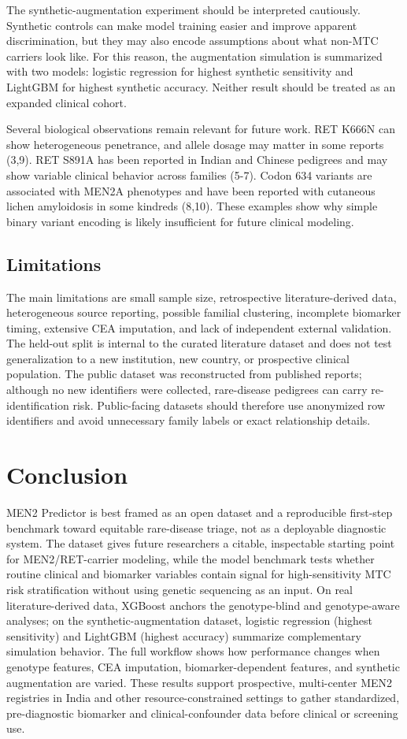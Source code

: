 \documentclass[12pt]{article}
\begin{document}
The synthetic-augmentation experiment should be interpreted cautiously. Synthetic controls can make model training easier and improve apparent discrimination, but they may also encode assumptions about what non-MTC carriers look like. For this reason, the augmentation simulation is summarized with two models: logistic regression for highest synthetic sensitivity and LightGBM for highest synthetic accuracy. Neither result should be treated as an expanded clinical cohort.

Several biological observations remain relevant for future work. RET K666N can show heterogeneous penetrance, and allele dosage may matter in some reports (3,9). RET S891A has been reported in Indian and Chinese pedigrees and may show variable clinical behavior across families (5-7). Codon 634 variants are associated with MEN2A phenotypes and have been reported with cutaneous lichen amyloidosis in some kindreds (8,10). These examples show why simple binary variant encoding is likely insufficient for future clinical modeling.

\subsection{Limitations}
The main limitations are small sample size, retrospective literature-derived data, heterogeneous source reporting, possible familial clustering, incomplete biomarker timing, extensive CEA imputation, and lack of independent external validation. The held-out split is internal to the curated literature dataset and does not test generalization to a new institution, new country, or prospective clinical population. The public dataset was reconstructed from published reports; although no new identifiers were collected, rare-disease pedigrees can carry re-identification risk. Public-facing datasets should therefore use anonymized row identifiers and avoid unnecessary family labels or exact relationship details.

\section{Conclusion}
MEN2 Predictor is best framed as an open dataset and a reproducible first-step benchmark toward equitable rare-disease triage, not as a deployable diagnostic system. The dataset gives future researchers a citable, inspectable starting point for MEN2/RET-carrier modeling, while the model benchmark tests whether routine clinical and biomarker variables contain signal for high-sensitivity MTC risk stratification without using genetic sequencing as an input. On real literature-derived data, XGBoost anchors the genotype-blind and genotype-aware analyses; on the synthetic-augmentation dataset, logistic regression (highest sensitivity) and LightGBM (highest accuracy) summarize complementary simulation behavior. The full workflow shows how performance changes when genotype features, CEA imputation, biomarker-dependent features, and synthetic augmentation are varied. These results support prospective, multi-center MEN2 registries in India and other resource-constrained settings to gather standardized, pre-diagnostic biomarker and clinical-confounder data before clinical or screening use.
\end{document}
